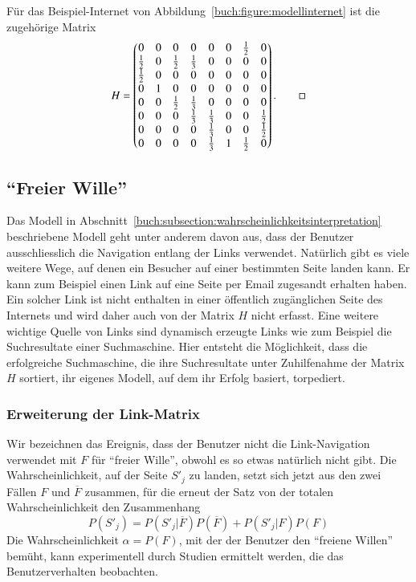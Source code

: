 \begin{beispiel}
Für das Beispiel-Internet von Abbildung~\ref{buch:figure:modellinternet}
ist die zugehörige Matrix
\[
H =
\begin{pmatrix}
   0   & 0&   0   &   0   &   0   & 0&\frac12&   0   \\
\frac12& 0&\frac12&\frac13&   0   & 0&   0   &   0   \\
\frac12& 0&   0   &   0   &   0   & 0&   0   &   0   \\
   0   & 1&   0   &   0   &   0   & 0&   0   &   0   \\
   0   & 0&\frac12&\frac13&   0   & 0&   0   &   0   \\
   0   & 0&   0   &\frac13&\frac13& 0&   0   &\frac12\\
   0   & 0&   0   &   0   &\frac13& 0&   0   &\frac12\\
   0   & 0&   0   &   0   &\frac13& 1&\frac12&   0
\end{pmatrix}.
\qedhere
\]
\end{beispiel}

%
%
\subsection{``Freier Wille''
\label{buch:subsection:freier-wille}}
Das Modell in
Abschnitt~\eqref{buch:subsection:wahrscheinlichkeitsinterpretation}
beschriebene Modell geht unter anderem davon aus, dass der Benutzer
ausschliesslich die Navigation entlang der Links verwendet.
Natürlich gibt es viele weitere Wege, auf denen ein Besucher auf einer
bestimmten Seite landen kann.
Er kann zum Beispiel einen Link auf eine Seite per Email zugesandt
erhalten haben.
Ein solcher Link ist nicht enthalten in einer öffentlich zugänglichen
Seite des Internets und wird daher auch von der Matrix $H$ nicht
erfasst.
Eine weitere wichtige Quelle von Links sind dynamisch erzeugte Links
wie zum Beispiel die Suchresultate einer Suchmaschine.
Hier entsteht die Möglichkeit, dass die erfolgreiche Suchmaschine,
die ihre Suchresultate unter Zuhilfenahme der Matrix $H$ sortiert,
ihr eigenes Modell, auf dem ihr Erfolg basiert, torpediert.

\subsubsection{Erweiterung der Link-Matrix}
Wir bezeichnen das Ereignis, dass der Benutzer nicht die Link-Navigation
verwendet mit $F$ für ``freier Wille'', obwohl es so etwas natürlich nicht
gibt.
Die Wahrscheinlichkeit, auf der Seite $S'_j$ zu landen, setzt sich jetzt
aus den zwei Fällen $F$ und $\overline{F}$ zusammen, für die erneut der
Satz von der totalen Wahrscheinlichkeit den Zusammenhang
\[
P(S'_j)
=
P(S'_j|\overline{F}) P(\overline{F})
+
P(S'_j|F) P(F)
\]
Die Wahrscheinlichkeit $\alpha = P(F)$, mit der der Benutzer den
``freiene Willen'' bemüht, kann experimentell durch Studien ermittelt
werden, die das Benutzerverhalten beobachten.

